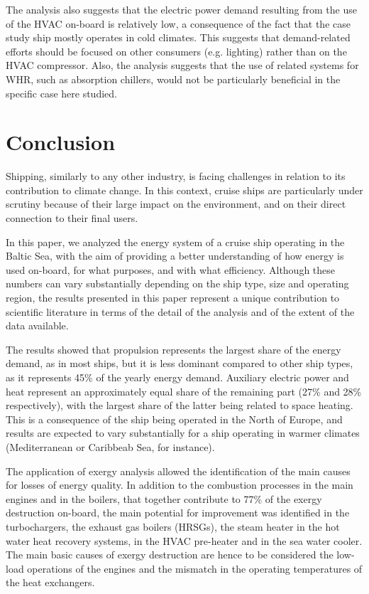 \documentclass[preprint,12pt]{elsarticle}
\begin{document}
The analysis also suggests that the electric power demand resulting from the use of the HVAC on-board is relatively low, a consequence of the fact that the case study ship mostly operates in cold climates. This suggests that demand-related efforts should be focused on other consumers (e.g. lighting) rather than on the HVAC compressor. Also, the analysis suggests that the use of related systems for WHR, such as absorption chillers, would not be particularly beneficial in the specific case here studied. 



\section{Conclusion} \label{sec:conclusion}

Shipping, similarly to any other industry, is facing challenges in relation to its contribution to climate change. In this context, cruise ships are particularly under scrutiny because of their large impact on the environment, and on their direct connection to their final users. 

In this paper, we analyzed the energy system of a cruise ship operating in the Baltic Sea, with the aim of providing a better understanding of how energy is used on-board, for what purposes, and with what efficiency. Although these numbers can vary substantially depending on the ship type, size and operating region, the results presented in this paper represent a unique contribution to scientific literature in terms of the detail of the analysis and of the extent of the data available. 

The results showed that propulsion represents the largest share of the energy demand, as in most ships, but it is less dominant compared to other ship types, as it represents 45\% of the yearly energy demand. Auxiliary electric power and heat represent an approximately equal share of the remaining part (27\% and 28\% respectively), with the largest share of the latter being related to space heating. This is a consequence of the ship being operated in the North of Europe, and results are expected to vary substantially for a ship operating in warmer climates (Mediterranean or Caribbeab Sea, for instance).

The application of exergy analysis allowed the identification of the main causes for losses of energy quality. In addition to the combustion processes in the main engines and in the boilers, that together contribute to 77\% of the exergy destruction on-board, the main potential for improvement was identified in the turbochargers, the exhaust gas boilers (HRSGs), the steam heater in the hot water heat recovery systems, in the HVAC pre-heater and in the sea water cooler. The main basic causes of exergy destruction are hence to be considered the low-load operations of the engines and the mismatch in the operating temperatures of the heat exchangers. 
\end{document}
